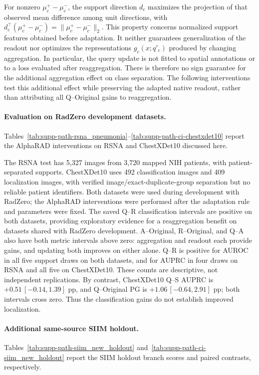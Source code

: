 For nonzero $\mu_c^+-\mu_c^-$, the support direction $d_c$ maximizes the projection of that observed mean difference among unit directions, with $d_c^\top(\mu_c^+-\mu_c^-)=\|\mu_c^+-\mu_c^-\|_2$. This property concerns normalized support features obtained before adaptation. It neither guarantees generalization of the readout nor optimizes the representations $g_c(x;q'_c)$ produced by changing aggregation. In particular, the query update is not fitted to spatial annotations or to a loss evaluated after reaggregation. There is therefore no sign guarantee for the additional aggregation effect on class separation. The following interventions test this additional effect while preserving the adapted native readout, rather than attributing all Q--Original gains to reaggregation.

\paragraph{Evaluation on RadZero development datasets.}
Tables~\ref{tab:supp-path-rsna_pneumonia}--\ref{tab:supp-path-ci-chestxdet10} report the AlphaRAD interventions on RSNA and ChestXDet10 discussed here.

The RSNA test has 5,327 images from 3,720 mapped NIH patients, with patient-separated supports. ChestXDet10 uses 492 classification images and 409 localization images, with verified image/exact-duplicate-group separation but no reliable patient identifiers. Both datasets were used during development with RadZero; the AlphaRAD interventions were performed after the adaptation rule and parameters were fixed. The saved Q--R classification intervals are positive on both datasets, providing exploratory evidence for a reaggregation benefit on datasets shared with RadZero development. A--Original, R--Original, and Q--A also have both metric intervals above zero: aggregation and readout each provide gains, and updating both improves on either alone. Q--R is positive for AUROC in all five support draws on both datasets, and for AUPRC in four draws on RSNA and all five on ChestXDet10. These counts are descriptive, not independent replications. By contrast, ChestXDet10 Q--S AUPRC is $+0.51\,[-0.14,1.39]$ pp, and Q--Original PG is $+1.06\,[-0.64,2.91]$ pp; both intervals cross zero. Thus the classification gains do not establish improved localization.

\paragraph{Additional same-source SIIM holdout.}
Tables~\ref{tab:supp-path-siim_new_holdout} and~\ref{tab:supp-path-ci-siim_new_holdout} report the SIIM holdout branch scores and paired contrasts, respectively.

